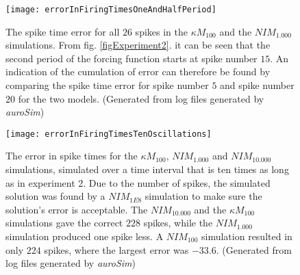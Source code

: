 \begin{figure}[hbt!p]
	\centering
  		\texttt{[image: errorInFiringTimesOneAndHalfPeriod]}
  	\caption[Spike time error for all $26$ spikes of experiment 2]{
			 	The spike time error for all $26$ spikes in the $\kappa M_{100}$ and the $NIM_{1.000}$ simulations.
				From fig. \ref{figExperiment2}. it can be seen that the second period of the forcing function starts at spike number $15$.
				An indication of the cumulation of error can therefore be found by comparing the spike time error for spike number $5$ and spike number $20$ for the two models. %
				(Generated from log files generated by \emph{auroSim})
			}
  	\label{figSpikeTimeErrorExperiment2}
\end{figure}
			
			


\begin{figure}[hbt!p]
	\centering
	\centerline{ %
		\texttt{[image: errorInFiringTimesTenOscillations]}
	}
	\caption[Spike time error for all spikes from an extended run of experiment 2. The simulation time interval is ten times as long as the forcing function in experiment 2 to make the accumulation of error prominent.]{
			 	The error in spike times for the $\kappa M_{100}$, $NIM_{1.000}$ and $NIM_{10.000}$  simulations, simulated over a time interval that is ten times as long as in experiment 2. 
				Due to the number of spikes, the simulated solution was found by a $NIM_{1E8}$ simulation to make sure the solution's error is acceptable. 
				The $NIM_{10.000}$ and the $\kappa M_{100}$ simulations gave the correct $228$ spikes, 
					while the $NIM_{1.000}$ simulation produced one spike less. %
				A $NIM_{100}$ simulation resulted in only $224$ spikes, where the largest error was $-33.6$. 
				(Generated from log files generated by \emph{auroSim})
			}
	\label{figExperiment2ErrorInTenSineOscillations}
\end{figure}

